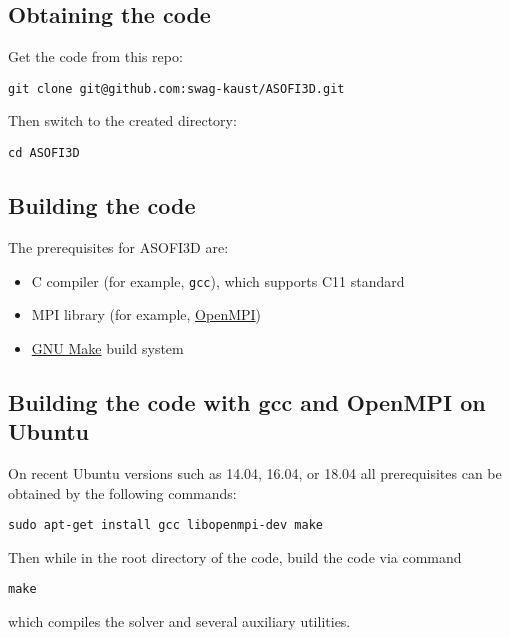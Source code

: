 \subsection{Obtaining the code}\label{obtaining-the-code}

Get the code from this repo:

\begin{verbatim}
git clone git@github.com:swag-kaust/ASOFI3D.git
\end{verbatim}

Then switch to the created directory:

\begin{verbatim}
cd ASOFI3D
\end{verbatim}

\subsection{Building the code}\label{building-the-code}

The prerequisites for ASOFI3D are:

\begin{itemize}
\tightlist
\item
  C compiler (for example, \texttt{gcc}), which supports C11 standard
\item
  MPI library (for example, \href{https://www.open-mpi.org/}{OpenMPI})
\item
  \href{https://www.gnu.org/software/make/}{GNU Make} build system
\end{itemize}

\subsection{Building the code with gcc and OpenMPI on
Ubuntu}\label{building-the-code-with-gcc-and-openmpi-on-ubuntu}

On recent Ubuntu versions such as 14.04, 16.04, or 18.04 all
prerequisites can be obtained by the following commands:

\begin{verbatim}
sudo apt-get install gcc libopenmpi-dev make
\end{verbatim}

Then while in the root directory of the code, build the code via command

\begin{verbatim}
make
\end{verbatim}

which compiles the solver and several auxiliary utilities.

